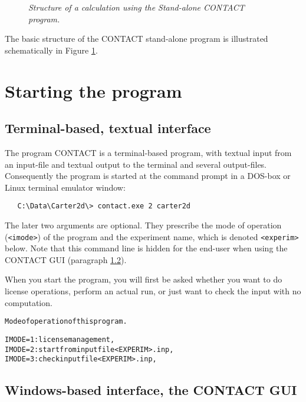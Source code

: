 \documentclass[12pt]{report}
\begin{document}
\begin{figure}[p]
\centering
{}
\caption{\em Structure of a calculation using the Stand-alone CONTACT program.}
\label{fig:arch_exe}
\end{figure}

The basic structure of the CONTACT stand-alone program is illustrated
schematically in Figure \ref{fig:arch_exe}.

\section{Starting the program}

\subsection{Terminal-based, textual interface}
\label{sec:term_based}

The program CONTACT is a terminal-based program, with textual input from
an input-file and textual output to the terminal and several output-files.
Consequently the program is started at the command prompt in a DOS-box or
Linux terminal emulator window:
{\small\begin{verbatim}
   C:\Data\Carter2d\> contact.exe 2 carter2d
\end{verbatim}}
The later two arguments are optional. They prescribe the mode of operation
({\tt <imode>}) of the program and the experiment name, which is denoted
\verb+<experim>+ below. Note that this command line is hidden for the
end-user when using the CONTACT GUI (paragraph \ref{sec:contact_gui}).

When you start the program, you will first be asked whether you want to do
license operations, perform an actual run, or just want to check the input
with no computation.
\begin{alltt}\small
   Mode of operation of this program.

   IMODE=1: license management,
   IMODE=2: start from input file <EXPERIM>.inp,
   IMODE=3: check input file <EXPERIM>.inp,
\end{alltt}

\subsection{Windows-based interface, the CONTACT GUI}
\label{sec:contact_gui}
\end{document}
